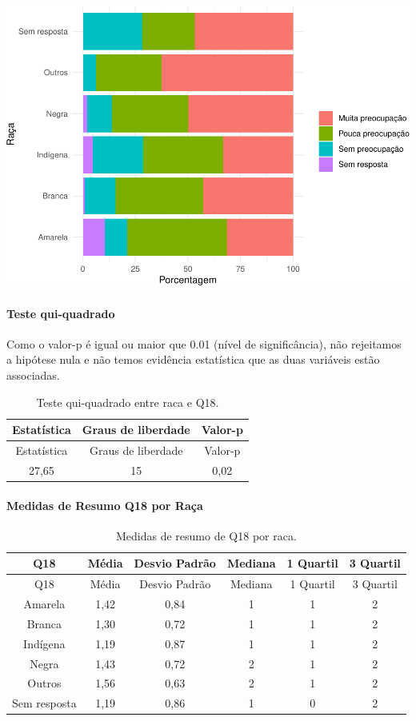 \documentclass[]{article}
\let\oldparagraph\paragraph
\renewcommand{\paragraph}[1]{\oldparagraph{#1}\mbox{}}
\begin{document}
\begin{center}\includegraphics[width=0.75\linewidth]{relatorio_covid19_files/figure-latex/unnamed-chunk-280-1} \end{center}

\hypertarget{teste-qui-quadrado-25}{%
\paragraph{Teste qui-quadrado}\label{teste-qui-quadrado-25}}

Como o valor-p é igual ou maior que 0.01 (nível de significância), não rejeitamos a hipótese nula e não temos evidência estatística que as duas variáveis estão associadas.

\begin{longtable}[]{@{}ccc@{}}
\caption{\label{tab:unnamed-chunk-282}Teste qui-quadrado entre raca e Q18.}\tabularnewline
\toprule
Estatística & Graus de liberdade & Valor-p\tabularnewline
\midrule
\endfirsthead
\toprule
Estatística & Graus de liberdade & Valor-p\tabularnewline
\midrule
\endhead
27,65 & 15 & 0,02\tabularnewline
\bottomrule
\end{longtable}

\cleardoublepage

\hypertarget{medidas-de-resumo-q18-por-rauxe7a}{%
\paragraph{Medidas de Resumo Q18 por Raça}\label{medidas-de-resumo-q18-por-rauxe7a}}

\begin{longtable}[]{@{}cccccc@{}}
\caption{\label{tab:unnamed-chunk-283}Medidas de resumo de Q18 por raca.}\tabularnewline
\toprule
Q18 & Média & Desvio Padrão & Mediana & 1 Quartil & 3 Quartil\tabularnewline
\midrule
\endfirsthead
\toprule
Q18 & Média & Desvio Padrão & Mediana & 1 Quartil & 3 Quartil\tabularnewline
\midrule
\endhead
Amarela & 1,42 & 0,84 & 1 & 1 & 2\tabularnewline
Branca & 1,30 & 0,72 & 1 & 1 & 2\tabularnewline
Indígena & 1,19 & 0,87 & 1 & 1 & 2\tabularnewline
Negra & 1,43 & 0,72 & 2 & 1 & 2\tabularnewline
Outros & 1,56 & 0,63 & 2 & 1 & 2\tabularnewline
Sem resposta & 1,19 & 0,86 & 1 & 0 & 2\tabularnewline
\bottomrule
\end{longtable}
\end{document}
